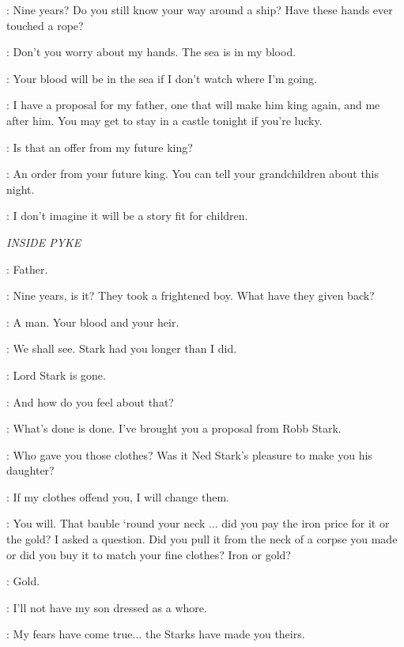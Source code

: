 \YARA: Nine years? Do you still know your way around a ship? Have these hands ever touched a rope?

\THEON: Don't you worry about my hands. The sea is in my blood.


\YARA: Your blood will be in the sea if I don't watch where I'm going.

\THEON: I have a proposal for my father, one that will make him king again, and me after him. You may get to stay in a castle tonight if you're lucky.

\YARA: Is that an offer from my future king?

\THEON: An order from your future king. You can tell your grandchildren about this night.

\YARA: I don't imagine it will be a story fit for children.


\scene

\textit{INSIDE PYKE}


\THEON: Father.

\BALON: Nine years, is it? They took a frightened boy. What have they given back?

\THEON: A man. Your blood and your heir.

\BALON: We shall see. Stark had you longer than I did.

\THEON: Lord Stark is gone.

\BALON: And how do you feel about that?

\THEON: What's done is done. I've brought you a proposal from Robb Stark.

\BALON: Who gave you those clothes? Was it Ned Stark's pleasure to make you his daughter?

\THEON: If my clothes offend you, I will change them.

\BALON: You will. That bauble `round your neck ... did you pay the iron price for it or the gold?  I asked a question. Did you pull it from the neck of a corpse you made or did you buy it to match your fine clothes? Iron or gold?

\THEON: Gold.

\BALON: I'll not have my son dressed as a whore.


\BALON: My fears have come true$\ldots$ the Starks have made you theirs.

